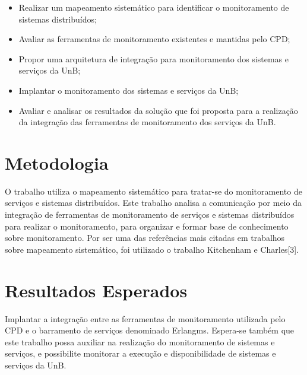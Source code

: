 \begin{itemize}
	 
\item Realizar um mapeamento sistemático para identificar o monitoramento
de sistemas distribuídos;

\item Avaliar as ferramentas de monitoramento existentes e mantidas pelo \acrshort{CPD};

\item Propor uma arquitetura de integração para monitoramento dos sistemas e serviços da \acrshort{UnB};

\item Implantar o monitoramento dos sistemas e serviços da \acrshort{UnB};

\item Avaliar e analisar os resultados da solução que foi proposta para a realização da integração das ferramentas de monitoramento dos serviços da \acrshort{UnB}. 

\end{itemize}

\section{Metodologia}

O trabalho utiliza o mapeamento sistemático para tratar-se do monitoramento de serviços e sistemas distribuídos. Este trabalho analisa a comunicação por meio da integração de ferramentas de monitoramento de serviços e sistemas distribuídos para realizar o monitoramento, para organizar e formar base de conhecimento sobre monitoramento. Por ser uma das referências mais citadas em trabalhos sobre mapeamento sistemático, foi utilizado o trabalho Kitchenham e Charles[3].


\section{Resultados Esperados}

Implantar a integração entre as ferramentas de monitoramento utilizada pelo \acrshort{CPD} e o barramento de serviços denominado Erlangms\cite{Agilar}. Espera-se também que este trabalho possa auxiliar na realização do monitoramento de sistemas e serviços, e possibilite monitorar a execução e disponibilidade de sistemas e serviços da \acrshort{UnB}.

